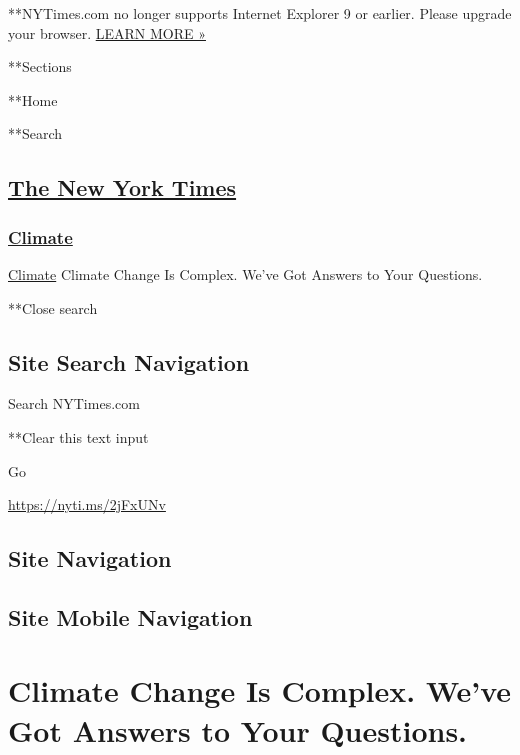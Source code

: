  **NYTimes.com no longer supports Internet Explorer 9 or earlier. Please
upgrade your browser.
\href{http://www.nytimes3xbfgragh.onion/content/help/site/ie9-support.html}{LEARN
MORE »}

**Sections

**Home

**Search

\hypertarget{the-new-york-times}{%
\subsection{\texorpdfstring{\href{http://www.nytimes3xbfgragh.onion/}{The
New York Times}}{The New York Times}}\label{the-new-york-times}}

\hypertarget{-climate-}{%
\subsubsection{\texorpdfstring{ \href{/section/climate}{Climate}
}{ Climate }}\label{-climate-}}

 \href{/section/climate}{Climate} \textbar{}Climate Change Is Complex.
We've Got Answers to Your Questions.

**Close search

\hypertarget{site-search-navigation}{%
\subsection{Site Search Navigation}\label{site-search-navigation}}

Search NYTimes.com

**Clear this text input

Go

\url{https://nyti.ms/2jFxUNv}

\hypertarget{site-navigation}{%
\subsection{Site Navigation}\label{site-navigation}}

\hypertarget{site-mobile-navigation}{%
\subsection{Site Mobile Navigation}\label{site-mobile-navigation}}

\hypertarget{climate-change-is-complex-weve-got-answers-to-your-questions}{%
\section{Climate Change Is Complex. We've Got Answers to Your
Questions.}\label{climate-change-is-complex-weve-got-answers-to-your-questions}}


